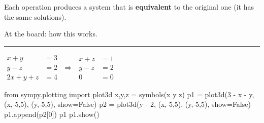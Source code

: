 \documentclass[
  letterpaper,
  DIV=11,
  numbers=noendperiod]{scrartcl}
\newenvironment{Shaded}{\begin{snugshade}}{\end{snugshade}}
\newcommand{\DecValTok}[1]{\textcolor[rgb]{0.68,0.00,0.00}{#1}}
\newcommand{\ImportTok}[1]{\textcolor[rgb]{0.00,0.46,0.62}{#1}}
\newcommand{\NormalTok}[1]{\textcolor[rgb]{0.00,0.23,0.31}{#1}}
\newcommand{\OperatorTok}[1]{\textcolor[rgb]{0.37,0.37,0.37}{#1}}
\newcommand{\StringTok}[1]{\textcolor[rgb]{0.13,0.47,0.30}{#1}}
\newcommand{\VariableTok}[1]{\textcolor[rgb]{0.07,0.07,0.07}{#1}}
\begin{document}
Each operation produces a system that is \textbf{equivalent} to the
original one (it has the same solutions).

At the board: how this works.

\begin{center}\rule{0.5\linewidth}{0.5pt}\end{center}

\(\begin{align*} x + y &= 3 \\ y - z &= 2 \\ 2x + y + z &= 4 \end{align*}\)
\(\Longrightarrow\)
\(\begin{align*} x + z &= 1 \\ y - z &= 2 \\ 0 &= 0 \end{align*}\)

\begin{Shaded}
\begin{Highlighting}[]
\ImportTok{from}\NormalTok{ sympy.plotting }\ImportTok{import}\NormalTok{ plot3d}
\NormalTok{x,y,z }\OperatorTok{=}\NormalTok{ symbols(}\StringTok{\textquotesingle{}x y z\textquotesingle{}}\NormalTok{)}
\NormalTok{p1 }\OperatorTok{=}\NormalTok{ plot3d(}\DecValTok{3} \OperatorTok{{-}}\NormalTok{ x }\OperatorTok{{-}}\NormalTok{ y, (x,}\OperatorTok{{-}}\DecValTok{5}\NormalTok{,}\DecValTok{5}\NormalTok{), (y,}\OperatorTok{{-}}\DecValTok{5}\NormalTok{,}\DecValTok{5}\NormalTok{), show}\OperatorTok{=}\VariableTok{False}\NormalTok{)}
\NormalTok{p2 }\OperatorTok{=}\NormalTok{ plot3d(y }\OperatorTok{{-}} \DecValTok{2}\NormalTok{, (x,}\OperatorTok{{-}}\DecValTok{5}\NormalTok{,}\DecValTok{5}\NormalTok{), (y,}\OperatorTok{{-}}\DecValTok{5}\NormalTok{,}\DecValTok{5}\NormalTok{), show}\OperatorTok{=}\VariableTok{False}\NormalTok{)}
\NormalTok{p1.append(p2[}\DecValTok{0}\NormalTok{])}
\NormalTok{p1}
\NormalTok{p1.show()}
\end{Highlighting}
\end{Shaded}
\end{document}
